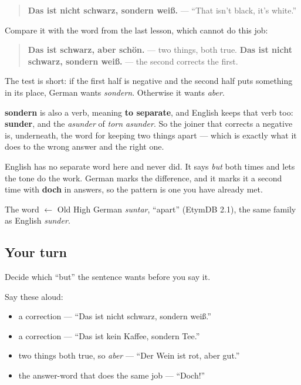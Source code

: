 \begin{quote}
\textbf{Das ist nicht schwarz, sondern weiß.} — \textquotedblleft{}That isn't black, it's white.\textquotedblright{}
\end{quote}

Compare it with the word from the last lesson, which cannot do this job:

\begin{quote}
\textbf{Das ist schwarz, aber schön.} — two things, both true. \textbf{Das ist nicht schwarz, sondern weiß.} — the second corrects the first.
\end{quote}

The test is short: if the first half is negative and the second half puts something in its place, German wants \emph{sondern}. Otherwise it wants \emph{aber}.

\begin{cousinweb}
\textbf{sondern} is also a verb, meaning \textbf{to separate}, and English keeps that verb too: \textbf{sunder}, and the \emph{asunder} of \emph{torn asunder}. So the joiner that corrects a negative is, underneath, the word for keeping two things apart — which is exactly what it does to the wrong answer and the right one.

English has no separate word here and never did. It says \emph{but} both times and lets the tone do the work. German marks the difference, and it marks it a second time with \textbf{doch} in answers, so the pattern is one you have already met.

The word $\leftarrow$ Old High German \emph{suntar}, \textquotedblleft{}apart\textquotedblright{} (EtymDB 2.1), the same family as English \emph{sunder}.
\end{cousinweb}

\subsection*{Your turn}
Decide which \textquotedblleft{}but\textquotedblright{} the sentence wants before you say it.

Say these aloud:

\begin{itemize}
\raggedright
  \item a correction — \textquotedblleft{}Das ist nicht schwarz, sondern weiß.\textquotedblright{}
  \item a correction — \textquotedblleft{}Das ist kein Kaffee, sondern Tee.\textquotedblright{}
  \item two things both true, so \emph{aber} — \textquotedblleft{}Der Wein ist rot, aber gut.\textquotedblright{}
  \item the answer-word that does the same job — \textquotedblleft{}Doch!\textquotedblright{}
\end{itemize}

